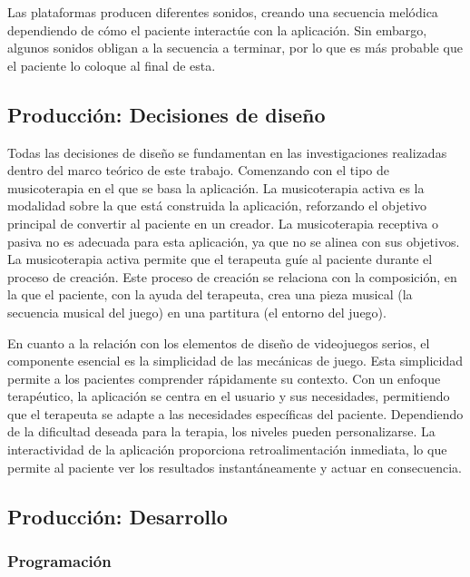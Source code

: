 Las plataformas producen diferentes sonidos, creando una secuencia melódica dependiendo de cómo el paciente interactúe con la aplicación. Sin embargo, algunos sonidos obligan a la secuencia a terminar, por lo que es más probable que el paciente lo coloque al final de esta.

\subsection{Producción: Decisiones de diseño}

Todas las decisiones de diseño se fundamentan en las investigaciones realizadas dentro del marco teórico de este trabajo. Comenzando con el tipo de musicoterapia en el que se basa la aplicación. La musicoterapia activa es la modalidad sobre la que está construida la aplicación, reforzando el objetivo principal de convertir al paciente en un creador. La musicoterapia receptiva o pasiva no es adecuada para esta aplicación, ya que no se alinea con sus objetivos. La musicoterapia activa permite que el terapeuta guíe al paciente durante el proceso de creación. Este proceso de creación se relaciona con la composición, en la que el paciente, con la ayuda del terapeuta, crea una pieza musical (la secuencia musical del juego) en una partitura (el entorno del juego).

En cuanto a la relación con los elementos de diseño de videojuegos serios, el componente esencial es la simplicidad de las mecánicas de juego. Esta simplicidad permite a los pacientes comprender rápidamente su contexto. Con un enfoque terapéutico, la aplicación se centra en el usuario y sus necesidades, permitiendo que el terapeuta se adapte a las necesidades específicas del paciente. Dependiendo de la dificultad deseada para la terapia, los niveles pueden personalizarse. La interactividad de la aplicación proporciona retroalimentación inmediata, lo que permite al paciente ver los resultados instantáneamente y actuar en consecuencia.

\subsection{Producción: Desarrollo}

\subsubsection{Programación}

